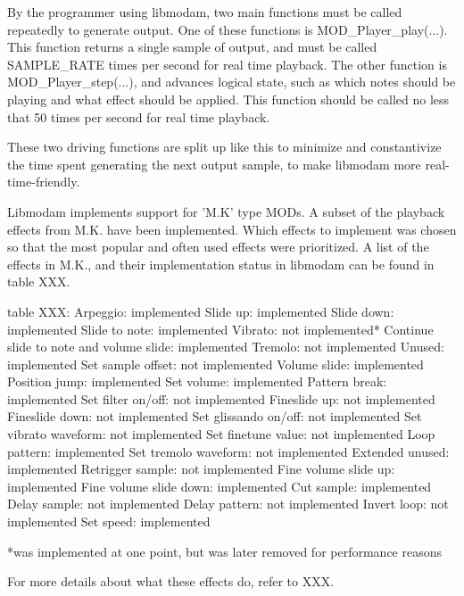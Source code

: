 By the programmer using libmodam, two main functions must be called repeatedly to generate output.
One of these functions is MOD_Player_play(...).
This function returns a single sample of output, and must be called SAMPLE_RATE times per second for real time playback.
The other function is MOD_Player_step(...), and advances logical state, such as which notes should be playing and what effect should be applied.
This function should be called no less that 50 times per second for real time playback.

These two driving functions are split up like this to minimize and constantivize the time spent generating the next output sample, to make libmodam more real-time-friendly.

Libmodam implements support for 'M.K' type MODs.
A subset of the playback effects from M.K. have been implemented.
Which effects to implement was chosen so that the most popular and often used effects were prioritized.
A list of the effects in M.K., and their implementation status in libmodam can be found in table XXX.

table XXX:
Arpeggio: implemented
Slide up: implemented
Slide down: implemented
Slide to note: implemented
Vibrato: not implemented*
Continue slide to note and volume slide: implemented
Tremolo: not implemented
Unused: implemented
Set sample offset: not implemented
Volume slide: implemented
Position jump: implemented
Set volume: implemented
Pattern break: implemented
Set filter on/off: not implemented
Fineslide up: not implemented
Fineslide down: not implemented
Set glissando on/off: not implemented
Set vibrato waveform: not implemented
Set finetune value: not implemented
Loop pattern: implemented
Set tremolo waveform: not implemented
Extended unused: implemented
Retrigger sample: not implemented
Fine volume slide up: implemented
Fine volume slide down: implemented
Cut sample: implemented
Delay sample: not implemented
Delay pattern: not implemented
Invert loop: not implemented
Set speed: implemented

*was implemented at one point, but was later removed for performance reasons


For more details about what these effects do, refer to XXX.






